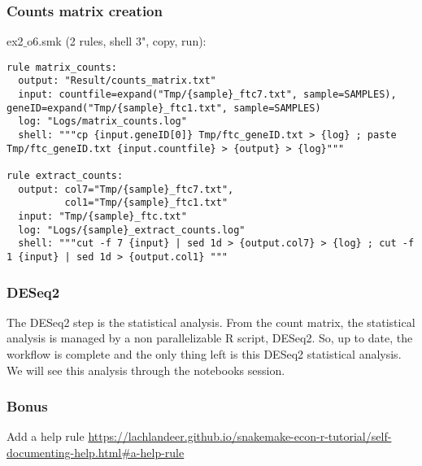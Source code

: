 \begin{frame}[containsverbatim]
\frametitle{Counts matrix creation}
\begin{exampleblock}{ex2$\_$o6.smk (2 rules, shell 3", copy, run):}
\begin{lstlisting}
rule matrix_counts:
  output: "Result/counts_matrix.txt"
  input: countfile=expand("Tmp/{sample}_ftc7.txt", sample=SAMPLES), geneID=expand("Tmp/{sample}_ftc1.txt", sample=SAMPLES)
  log: "Logs/matrix_counts.log"
  shell: """cp {input.geneID[0]} Tmp/ftc_geneID.txt > {log} ; paste Tmp/ftc_geneID.txt {input.countfile} > {output} > {log}"""

rule extract_counts:
  output: col7="Tmp/{sample}_ftc7.txt",
          col1="Tmp/{sample}_ftc1.txt"
  input: "Tmp/{sample}_ftc.txt"
  log: "Logs/{sample}_extract_counts.log"
  shell: """cut -f 7 {input} | sed 1d > {output.col7} > {log} ; cut -f 1 {input} | sed 1d > {output.col1} """
\end{lstlisting}
\end{exampleblock}
\end{frame}
\begin{frame}[containsverbatim]
\frametitle{DESeq2}
The DESeq2 step is the statistical analysis. From the count matrix, the statistical analysis is managed by a non parallelizable R script, DESeq2.
\vfill
So, up to date, the workflow is complete and the only thing left is this DESeq2 statistical analysis. We will see this analysis through the notebooks session.
\end{frame}
\begin{frame}[containsverbatim]
\frametitle{Bonus}
\begin{exampleblock}{Add a help rule}
\url{https://lachlandeer.github.io/snakemake-econ-r-tutorial/self-documenting-help.html#a-help-rule}
\end{exampleblock}
\end{frame}
